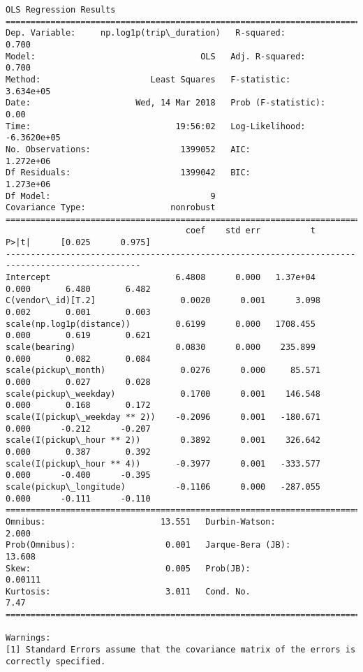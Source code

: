 \documentclass[11pt]{article}
\begin{document}
    \begin{Verbatim}[commandchars=\\\{\}]
                               OLS Regression Results                              
===================================================================================
Dep. Variable:     np.log1p(trip\_duration)   R-squared:                       0.700
Model:                                 OLS   Adj. R-squared:                  0.700
Method:                      Least Squares   F-statistic:                 3.634e+05
Date:                     Wed, 14 Mar 2018   Prob (F-statistic):               0.00
Time:                             19:56:02   Log-Likelihood:            -6.3620e+05
No. Observations:                  1399052   AIC:                         1.272e+06
Df Residuals:                      1399042   BIC:                         1.273e+06
Df Model:                                9                                         
Covariance Type:                 nonrobust                                         
=================================================================================================
                                    coef    std err          t      P>|t|      [0.025      0.975]
-------------------------------------------------------------------------------------------------
Intercept                         6.4808      0.000   1.37e+04      0.000       6.480       6.482
C(vendor\_id)[T.2]                 0.0020      0.001      3.098      0.002       0.001       0.003
scale(np.log1p(distance))         0.6199      0.000   1708.455      0.000       0.619       0.621
scale(bearing)                    0.0830      0.000    235.899      0.000       0.082       0.084
scale(pickup\_month)               0.0276      0.000     85.571      0.000       0.027       0.028
scale(pickup\_weekday)             0.1700      0.001    146.548      0.000       0.168       0.172
scale(I(pickup\_weekday ** 2))    -0.2096      0.001   -180.671      0.000      -0.212      -0.207
scale(I(pickup\_hour ** 2))        0.3892      0.001    326.642      0.000       0.387       0.392
scale(I(pickup\_hour ** 4))       -0.3977      0.001   -333.577      0.000      -0.400      -0.395
scale(pickup\_longitude)          -0.1106      0.000   -287.055      0.000      -0.111      -0.110
==============================================================================
Omnibus:                       13.551   Durbin-Watson:                   2.000
Prob(Omnibus):                  0.001   Jarque-Bera (JB):               13.608
Skew:                           0.005   Prob(JB):                      0.00111
Kurtosis:                       3.011   Cond. No.                         7.47
==============================================================================

Warnings:
[1] Standard Errors assume that the covariance matrix of the errors is correctly specified.

    \end{Verbatim}
\end{document}
